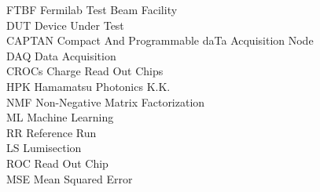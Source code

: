 \begin{tabbing}
	FTBF \> Fermilab Test Beam Facility\\
	DUT \> Device Under Test\\
	CAPTAN \> Compact And Programmable daTa Acquisition Node\\
	DAQ \> Data Acquisition\\
	CROCs \> Charge Read Out Chips\\
	HPK \> Hamamatsu Photonics K.K.\\
	NMF \> Non-Negative Matrix Factorization\\
	ML \> Machine Learning\\
    RR \> Reference Run\\
	LS \> Lumisection\\
	ROC \> Read Out Chip\\
    MSE \> Mean Squared Error\\


\end{tabbing}
